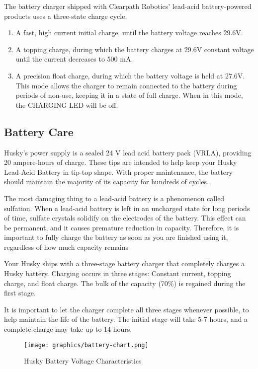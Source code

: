 \documentclass[]{clearpath-latex/clearpath-manual}
\begin{document}
The battery charger shipped with Clearpath Robotics’ lead-acid
battery-powered products uses a three-state charge cycle.

\begin{enumerate}
		\item A fast, high current initial charge, until the battery voltage reaches 29.6V.
		\item A topping charge, during which the battery charges at 29.6V constant voltage
		until the current decreases to 500 mA.
		\item A precision float charge, during which the battery voltage is held at 27.6V.
		This mode allows the charger to remain connected to the battery during periods of non-use,
		keeping it in a state of full charge. When in this mode, the CHARGING LED will be off.
\end{enumerate}

\subsection{Battery Care}
Husky’s power supply is a sealed 24 V lead acid battery pack (VRLA), providing 20 ampere-hours of charge. These tips are
intended to help keep your Husky Lead-Acid Battery in tip-top shape.  With proper maintenance, the battery should
maintain the majority of its capacity for hundreds of cycles.

The most damaging thing to a lead-acid battery is a phenomenon called sulfation.
When a lead-acid battery is left in an uncharged state for long periods of time,
sulfate crystals solidify on the electrodes of the battery.  This effect can be permanent,
and it causes premature reduction in capacity.  Therefore, it is important to fully charge
the battery as soon as you are finished using it, regardless of how much capacity remains

Your Husky ships with a three-stage battery charger that completely charges a Husky battery.
Charging occurs in three stages: Constant current, topping charge, and float charge.
The bulk of the capacity (70\%) is regained during the first stage.

It is important to let the charger complete all three stages whenever possible,
to help maintain the life of the battery.  The initial stage will take 5-7 hours,
and a complete charge may take up to 14 hours.

\begin{figure}[h]
	\centering
	\texttt{[image: graphics/battery-chart.png]}
	\caption{Husky Battery Voltage Characteristics}
	\label{battery-chart}
\end{figure}
\end{document}
